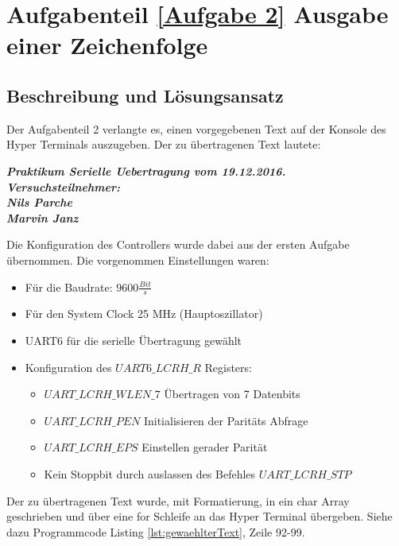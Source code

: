 	\section{Aufgabenteil \ref{Aufgabe 2} Ausgabe einer Zeichenfolge}
	\subsection{Beschreibung und Lösungsansatz}  

Der Aufgabenteil 2 verlangte es, einen vorgegebenen Text auf der Konsole des Hyper Terminals auszugeben. Der zu übertragenen Text lautete:

\begin{flushleft}
\textbf{\textit{Praktikum Serielle Uebertragung vom 19.12.2016.}\\
	\bigskip
	\textit{Versuchsteilnehmer:}\\
	\bigskip
	\textit{Nils Parche}\\
	\textit{Marvin Janz}}\\
\end{flushleft}

Die Konfiguration des Controllers wurde dabei aus der ersten Aufgabe übernommen. Die vorgenommen Einstellungen waren: 
\begin{itemize}
	\item Für die Baudrate: $9600 \frac{Bit}{s}$
	\item Für den System Clock 25 MHz (Hauptoszillator)
	\item UART6 für die serielle Übertragung gewählt
	\item Konfiguration des $UART6\_LCRH\_R$ Registers:\cite{Datenblatt_TM4C1294} \begin{itemize}
		\item $UART\_LCRH\_WLEN\_7$ Übertragen von 7 Datenbits
		\item $UART\_LCRH\_PEN$ Initialisieren der Paritäts Abfrage
		\item $UART\_LCRH\_EPS$ Einstellen gerader Parität
		\item Kein Stoppbit durch auslassen des Befehles $UART\_LCRH\_STP$
	\end{itemize}
\end{itemize}

Der zu übertragenen Text wurde, mit Formatierung, in ein char Array geschrieben und über eine for Schleife an das Hyper Terminal  übergeben. Siehe dazu Programmcode Listing \ref{lst:gewaehlterText}, Zeile 92-99.

\newpage

